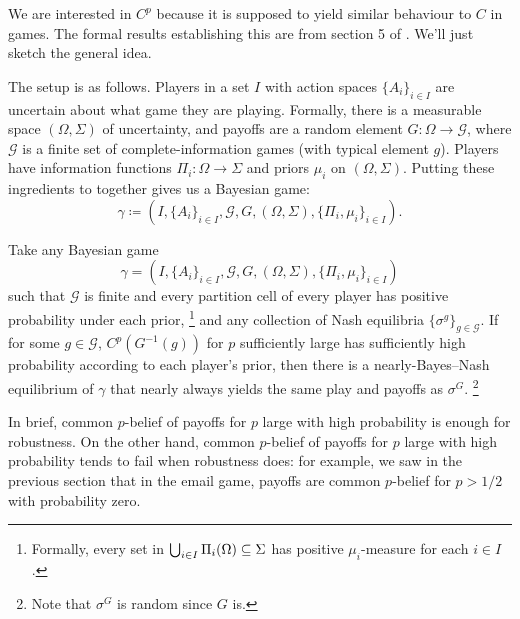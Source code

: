 \documentclass[11pt,letterpaper,reqno,oneside]{article}
\begin{document}
We are interested in $C^p$ because it is supposed to yield similar behaviour to $C$ in games. The formal results establishing this are from section 5 of \textcite{MondererSamet1989}. We'll just sketch the general idea.

The setup is as follows. Players in a set $I$ with action spaces $\{ A_i \}_{i \in I}$ are uncertain about what game they are playing. Formally, there is a measurable space $(\Omega,\Sigma)$ of uncertainty, and payoffs are a random element $G : \Omega \to \mathcal{G}$, where $\mathcal{G}$ is a finite set of complete-information games (with typical element $g$). Players have information functions $\Pi_i : \Omega \to \Sigma$ and priors $\mu_i$ on $(\Omega,\Sigma)$. Putting these ingredients to together gives us a Bayesian game:
%
\begin{equation*}
	\gamma \coloneqq \left(
	I, \{ A_i \}_{i \in I}, \mathcal{G}, G, (\Omega,\Sigma), \{\Pi_i,\mu_i\}_{i \in I}
	\right) .
\end{equation*}


\begin{theorem}
	\label{theorem:MondererSamet}
	Take any Bayesian game
	\begin{equation*}
		\gamma = \left(
		I, \{ A_i \}_{i \in I}, \mathcal{G}, G, (\Omega,\Sigma), \{\Pi_i,\mu_i\}_{i \in I}
		\right) 
	\end{equation*}
	such that $\mathcal{G}$ is finite and every partition cell of every player has positive probability under each prior,%
		\footnote{Formally, every set in $\bigcup_{i \in I} \Pi_i(\Omega) \subseteq \Sigma$ has positive $\mu_i$-measure for each $i \in I$.}
	and any collection of Nash equilibria $\{ \sigma^g \}_{g \in \mathcal{G}}$. 
	If for some $g \in \mathcal{G}$, $C^p( G^{-1}(g) )$ for $p$ sufficiently large has sufficiently high probability according to each player's prior, then there is a nearly-Bayes--Nash equilibrium of $\gamma$ that nearly always yields the same play and payoffs as $\sigma^G$.%
		\footnote{Note that $\sigma^G$ is random since $G$ is.}
\end{theorem}


In brief, common $p$-belief of payoffs for $p$ large with high probability is enough for robustness. On the other hand, common $p$-belief of payoffs for $p$ large with high probability tends to fail when robustness does: for example, we saw in the previous section that in the email game, payoffs are common $p$-belief for $p>1/2$ with probability zero.
\end{document}

